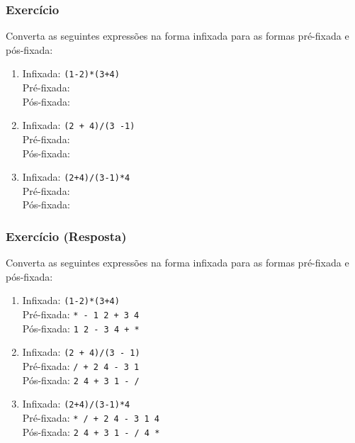 \documentclass[aspectratio=169]{beamer}
\begin{document}
\begin{frame}\frametitle{Exercício}
Converta as seguintes expressões na forma infixada para as formas pré-fixada e pós-fixada:
\begin{enumerate}
	\item	Infixada: \texttt{(1-2)*(3+4)}\\
		Pré-fixada: \\
		Pós-fixada: \\
	\item	Infixada: \texttt{(2 + 4)/(3 -1)}\\
		Pré-fixada: \\
		Pós-fixada: \\
	\item	Infixada: \texttt{(2+4)/(3-1)*4}\\
		Pré-fixada: \\
		Pós-fixada: \\
\end{enumerate}
\end{frame}

\begin{frame}\frametitle{Exercício (Resposta)}
Converta as seguintes expressões na forma infixada para as formas pré-fixada e pós-fixada:
\begin{enumerate}
	\item	Infixada: \texttt{(1-2)*(3+4)}\\
		Pré-fixada: \texttt{* - 1 2 + 3 4}\\
		Pós-fixada: \texttt{1 2 - 3 4 + *}\\
	\item	Infixada: \texttt{(2 + 4)/(3 - 1)}\\
		Pré-fixada: \texttt{/ + 2 4 - 3 1}\\
		Pós-fixada: \texttt{2 4 + 3 1 - /}\\
	\item	Infixada: \texttt{(2+4)/(3-1)*4}\\
		Pré-fixada: \texttt{* / + 2 4 - 3 1 4}\\
		Pós-fixada: \texttt{2 4 + 3 1 - / 4 *}\\
\end{enumerate}
\end{frame}
\end{document}
